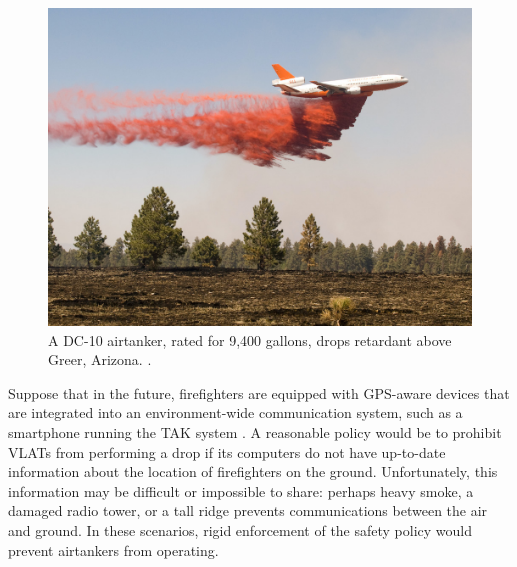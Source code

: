 \documentclass[]             %
{NASA}                       %
\theoremstyle{definition}
\begin{document}
\begin{figure}[h]
  \label{fig:airtanker}
  \centering
  \includegraphics[scale=0.4]{images/dc10.jpg}
  \caption{A DC-10 airtanker, rated for 9,400 gallons, drops retardant above Greer, Arizona. \citationneeded.}
\end{figure}

Suppose that in the future, firefighters are equipped with GPS-aware
devices that are integrated into an environment-wide communication
system, such as a smartphone running the TAK system \citationneeded. A
reasonable policy would be to prohibit VLATs from performing a drop if
its computers do not have up-to-date information about the location of
firefighters on the ground. Unfortunately, this information may be
difficult or impossible to share: perhaps heavy smoke, a damaged radio
tower, or a tall ridge prevents communications between the air and
ground. In these scenarios, rigid enforcement of the safety policy
would prevent airtankers from operating.
\end{document}
